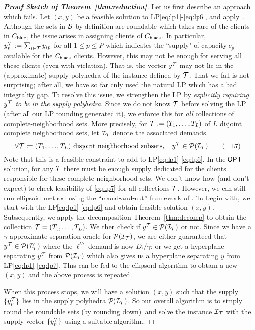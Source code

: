 \begin{proof}[{\bf Proof Sketch of Theorem~\ref{thm:reduction}}]
Let us first describe an approach which fails. Let $(x,y)$ be a feasible solution to LP\eqref{eq:lp1}-\eqref{eq:lp6}, and apply~.
Although the sets in ${\cal S}$ by definition are roundable which takes care of the clients in $C_{\mathsf{blue}}$, the issue arises in assigning clients of $C_{\mathsf{black}}$.
In particular, $y^{\cal T}_p := \sum_{i\in {\cal T}} y_{ip}$ for all $1\le p\le P$ which indicates the ``supply" of capacity $c_p$ available for the $C_{\mathsf{black}}$ clients.
However, this may not be enough for serving all these clients (even with violation).
That is, the vector $y^{\cal T}$ may not lie in the (approximate) supply polyhedra of the \cckp instance
defined by ${\cal T}$. %
 That we fail is not surprising; after all, we have so far only used the natural LP which has a bad integrality gap. To resolve this issue, we strengthen the LP by {\em explicitly requiring $y^{\cal T}$ to be in the supply polyhedra}. Since we do not know ${\cal T}$ before solving the LP (after all our LP rounding generated it), we enforce this for {\em all} collections of complete-neighborhood sets.
More precisely, for ${\cal T} := (T_1,\ldots,T_L)$ of $L$ disjoint complete neighborhood sets, let ${\cal I}_{\cal T}$ denote the associated \cckp demands.
\begin{equation}\label{eq:lp7}
\forall \calT := (T_1,\ldots,T_L) \textrm{ disjoint neighborhood subsets}, \quad \yy \in \calP(\calI_\calT) \tag{\small{L7}}
\end{equation}
Note that this is a feasible constraint to add to LP\eqref{eq:lp1}-\eqref{eq:lp6}. In the $\mathsf{OPT}$ solution, for any ${\cal T}$ there must be enough supply dedicated for the clients responsible for these complete neighborhood sets.  We don't know how (and don't expect) to check feasibility of  \eqref{eq:lp7} for all collections ${\cal T}$. However, we can still run ellipsoid method using the ``round-and-cut'' framework of \cite{CarrFLP00,ChakrabartyCKK11,Li15,Li16}.
To begin with, we start with the LP\eqref{eq:lp1}-\eqref{eq:lp6} and obtain feasible solution $(x,y)$. Subsequently, we apply the decomposition Theorem~\ref{thm:decomp} to obtain the collection ${\cal T} = (T_1,\ldots,T_L)$.
We then check if $y^{\cal T} \in {\cal P}({\cal I}_{\cal T})$ or not. Since we have a $\gamma$-approximate separation oracle for ${\cal P}({\cal I}_{\cal T})$, we  are either guaranteed that $y^{\cal T} \in {\cal P}({\cal I}'_{\cal T})$ where the $\ell^{th}$ demand is now  $D_\ell/\gamma$; or we get a hyperplane separating $y^{\cal T}$ from ${\cal P}({\cal I}_{\cal T})$ which also gives us a
hyperplane separating $y$ from  LP\eqref{eq:lp1}-\eqref{eq:lp7}. This can be fed to the ellipsoid algorithm to obtain a new  $(x,y)$ and the above process is repeated.

When this process stops, we will have a solution $(x,y)$ such that the supply $\{y_p^{{\cal T}}\}$ lies in the supply polyhedra ${\cal P}({\cal I}_{\cal T})$. So our overall algorithm is to simply round the roundable sets (by rounding down), and solve the instance ${\cal I}_{\cal T}$ with the supply vector $\{y_p^{\cal T}\}$ using a suitable \cckp algorithm.
\end{proof}

